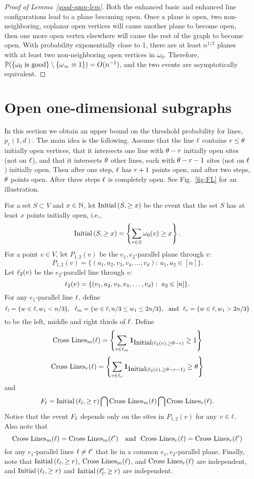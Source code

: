 \begin{proof}[Proof of Lemma~\ref{good-span-lem}]
Both the enhanced basic and enhanced line configurations lead to a plane becoming open.  Once a plane is open, two non-neighboring, coplanar open vertices will cause another plane to become open, then one more open vertex elsewhere will cause the rest of the graph to become open.  With probability exponentially close to 1, there are at least $n^{1/2}$ planes with at least two non-neighboring open vertices in $\omega_0$.  Therefore, $\mathbb{P}(\{\omega_0 \text{ is } \text{good}\} \setminus \{\omega_\infty \equiv1\})= O(n^{-1})$, and the two events are asymptotically equivalent.
\end{proof}



\section{Open one-dimensional subgraphs} \label{lines}
In this section 
we obtain an upper bound on the threshold probability for lines, $p_c(1,d)$. The main idea is the following.  Assume that the line $\ell$ contains  $r \le \theta$ initially open vertices, that it intersects one line with $\theta-r$ initially open sites (not on $\ell$), and that it intersects $\theta$ other lines, each with $\theta - r-1$ sites (not on $\ell$) initially open. 
Then after one step, $\ell$ has $r +1$ points open, and after two steps, $\theta$ points open. After three steps $\ell$ is completely open. See Fig.~\ref{fig:FL} for an illustration.

 For a set $S \subset V$ and $x \in \mathbb{N}$, let $\hbox{Initial}\left(S, \geq x\right)$ be the event that the set $S$ has at least $x$ points initially open, i.e.,
 $$\hbox{Initial}\left(S, \geq x\right)= \left\{\sum_{v \in S}\omega_0(v) \geq x\right\}.$$
For a point $v \in V$, let $P_{1,2}(v)$ be the $e_1,e_2$-parallel plane through $v$:
$$P_{1,2}(v)=\{(a_1,a_2,v_3,v_4,\dots,v_d):\ a_1,a_2 \in [n]\}.$$
Let $\ell_2(v)$ be the $e_2$-parallel line through $v$:
$$\Ln_2(v) = \{(v_1,a_2,v_3,v_4,\dots,v_d):\ a_2 \in [n]\}.$$
For any $e_1$-parallel line $\ell$, define 
$$\Ln_l = \{w \in \Ln, w_1 < n/3\}, \ \ \Ln_m = \{w \in \Ln, n/3 \leq w_1 \leq 2n/3\}, \ \ \text{and} \ \ 
\Ln_r = \{w \in \Ln, w_1 > 2n/3\}$$ to be the left, middle and right thirds of $\ell$. Define
$$\hbox{Cross Lines}_m(\ell)=\left\{\sum_{v \in \ell_m} \mathbf{1}_{\hbox{Initial}\left(\ell_2(v), \geq \theta-r\right)} \geq 1\right\}$$
$$\hbox{Cross Lines}_r(\ell)=\left\{\sum_{v \in \ell_r} \mathbf{1}_{\hbox{Initial}\left(\ell_2(v), \geq \theta-r-1\right)} \geq \theta \right\}$$
and
$$F_\ell=
\hbox{Initial}\left(\ell_l, \geq r\right)\bigcap \hbox{Cross Lines}_m(\ell)\bigcap \hbox{Cross Lines}_r(\ell)
.$$
Notice that the event $F_\ell$ depends only on the sites in $P_{1,2}(v)$ for any $v \in \ell$.
Also note that
$$\Gone{\Ln}=\Gone{\Ln'} \ \ \text{ and} \ \ \Gtwo{\Ln}=\Gtwo{\Ln'}$$
for any $e_1$-parallel lines $\ell \neq \ell'$ that lie in a common $e_1,e_2$-parallel plane. Finally, note that $\hbox{Initial}\left(\ell_l, \geq r\right)$,  $\hbox{Cross Lines}_m(\ell)$, and $ \hbox{Cross Lines}_r(\ell)$ are independent, and $\hbox{Initial}\left(\ell_l, \geq r\right)$ and $\hbox{Initial}\left(\ell'_l, \geq r\right)$ are independent.

